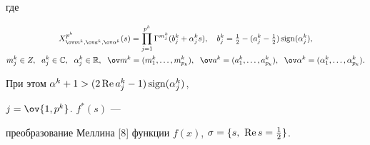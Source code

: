 где 


\begin{gather*} 


X^{p^k}_{\ov m^k,\ov a^k,\ov\alpha^k}(s)=\prod^{p^k}_{j=1} 


\Gamma^{m^k_j}(b^k_j+\alpha^k_j s),\quad 


b^k_j=\tfrac{1}{2}-(a^k_j-\tfrac{1}{2})\sign(\alpha^k_j), \\ 


% 


m^k_j\in Z,\ \; a^k_j\in\Bbb C,\ \; \alpha^k_j\in\Bbb R, 


\ \; \ov m^k=(m^k_1,\dotsc,m^k_{p_k}), 


\ \; \ov a^k=(a^k_1,\dotsc,a^k_{p_k}), 


\ \; \ov\alpha^k=(\alpha^k_1,\dotsc,\alpha^k_{p_k}). 


\end{gather*} 


При этом $\alpha^k+1>(2\operatorname{Re} a^k_j-1)\operatorname{sign}(\alpha^k_j)$, 


$j=\ov{1,p^k}$.\; $f^*(s)$ --- 


преобразование Меллина [8] функции $f(x)$, $\sigma=\{s,\ \re 


s=\frac{1}{2}\}$. 


\addtocounter{defn}{1} 


 


